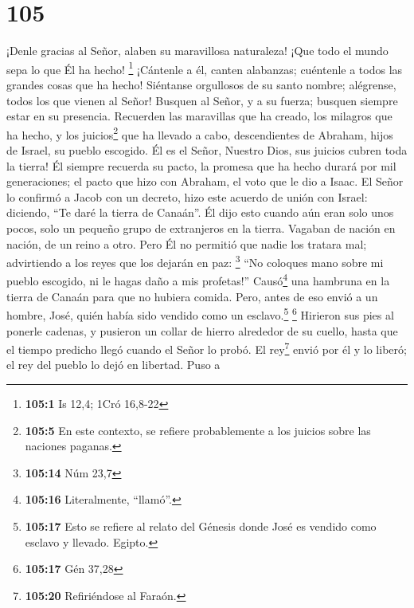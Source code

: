 \hypertarget{section-104}{%
\section{105}\label{section-104}}

 ¡Denle gracias al Señor, alaben su maravillosa
naturaleza! ¡Que todo el mundo sepa lo que Él ha hecho! \footnote{\textbf{105:1}
  Is 12,4; 1Cró 16,8-22}  ¡Cántenle a él, canten
alabanzas; cuéntenle a todos las grandes cosas que ha hecho!
 Siéntanse orgullosos de su santo nombre; alégrense, todos
los que vienen al Señor!  Busquen al Señor, y a su fuerza;
busquen siempre estar en su presencia.  Recuerden las
maravillas que ha creado, los milagros que ha hecho, y los
juicios\footnote{\textbf{105:5} En este contexto, se refiere
  probablemente a los juicios sobre las naciones paganas.} que ha
llevado a cabo,  descendientes de Abraham, hijos de
Israel, su pueblo escogido.  Él es el Señor, Nuestro Dios,
sus juicios cubren toda la tierra!  Él siempre recuerda su
pacto, la promesa que ha hecho durará por mil generaciones;
 el pacto que hizo con Abraham, el voto que le dio a
Isaac.  El Señor lo confirmó a Jacob con un decreto, hizo
este acuerdo de unión con Israel:  diciendo, ``Te daré la
tierra de Canaán''.  Él dijo esto cuando aún eran solo
unos pocos, solo un pequeño grupo de extranjeros en la tierra.
 Vagaban de nación en nación, de un reino a otro.
 Pero Él no permitió que nadie los tratara mal;
advirtiendo a los reyes que los dejarán en paz: \footnote{\textbf{105:14}
  Núm 23,7}  ``No coloques mano sobre mi pueblo escogido,
ni le hagas daño a mis profetas!''  Causó\footnote{\textbf{105:16}
  Literalmente, ``llamó''.} una hambruna en la tierra de Canaán para que
no hubiera comida.  Pero, antes de eso envió a un hombre,
José, quién había sido vendido como un esclavo.\footnote{\textbf{105:17}
  Esto se refiere al relato del Génesis donde José es vendido como
  esclavo y llevado. Egipto.} \footnote{\textbf{105:17} Gén 37,28}
 Hirieron sus pies al ponerle cadenas, y pusieron un
collar de hierro alrededor de su cuello,  hasta que el
tiempo predicho llegó cuando el Señor lo probó.  El
rey\footnote{\textbf{105:20} Refiriéndose al Faraón.} envió por él y lo
liberó; el rey del pueblo lo dejó en libertad.  Puso a
